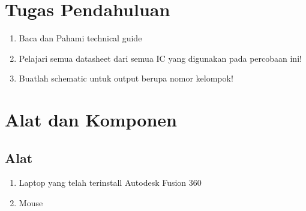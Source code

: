 \section{Tugas Pendahuluan}
\begin{enumerate}
    \item Baca dan Pahami technical guide
    \item Pelajari semua datasheet dari semua IC yang digunakan pada percobaan ini!
    \item Buatlah schematic untuk output berupa nomor kelompok!
\end{enumerate}

\section{Alat dan Komponen}
\subsection{Alat}
\begin{enumerate}
    \item Laptop yang telah terinstall Autodesk Fusion 360
    \item Mouse
\end{enumerate}

